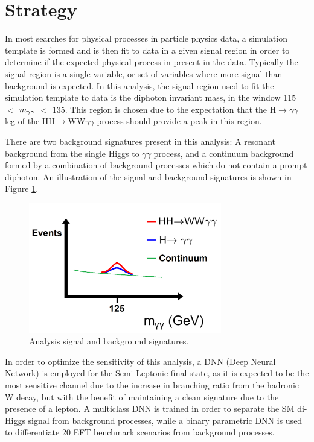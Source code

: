 \section{Strategy} \label{sec:Strategy}

In most searches for physical processes in particle physics data, a simulation template is formed and is then fit to data in a given signal region in order to determine if the expected physical process in present in the data. Typically the signal region is a single variable, or set of variables where more signal than background is expected. In this analysis, the signal region used to fit the simulation template to data is the diphoton invariant mass, in the window 115 $<$ $m_{\gamma\gamma}$ $<$ 135. This region is chosen due to the expectation that the H$\rightarrow\gamma\gamma$ leg of the HH$\rightarrow$WW$\gamma\gamma$ process should provide a peak in this region.

There are two background signatures present in this analysis: A resonant background from the single Higgs to $\gamma\gamma$ process, and a continuum background formed by a combination of background processes which do not contain a prompt diphoton. An illustration of the signal and background signatures is shown in Figure \ref{fig:Signatures}.

\begin{figure}[h!]
    \centering
    \includegraphics[width=0.75\textwidth]{Sections/HHWWgg/images/Strategy/HHWWgg_ResbkgPlot.png}
    \caption{Analysis signal and background signatures.}
    \label{fig:Signatures}
\end{figure}

In order to optimize the sensitivity of this analysis,
a DNN (Deep Neural Network) is employed for the Semi-Leptonic final state, as it is expected to be the most sensitive channel due to the increase in branching ratio
from the hadronic W decay, but with the benefit of maintaining a clean signature due to the presence of a lepton. A multiclass DNN is trained in order to separate the SM di-Higgs signal from background processes, while a binary parametric DNN is used to differentiate 20 EFT benchmark scenarios from background processes.

